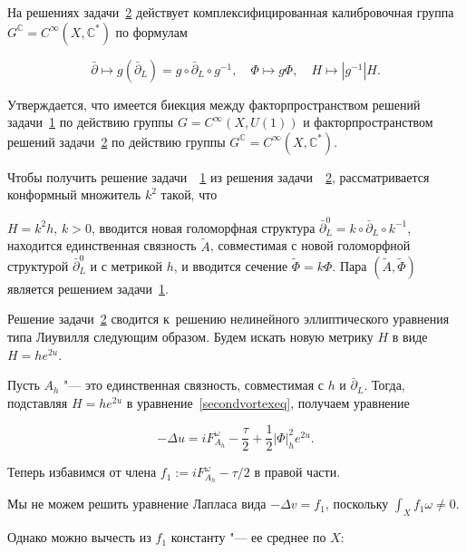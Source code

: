 \smallskip







На решениях задачи~\hyperlink{plv:2}{2} действует комплексифицированная калибровочная группа $G^{\mathbb C}=C^{\infty}(X, \mathbb C^*)$ по формулам

$$

\bar\partial\mapsto g(\bar\partial_L) =g\circ \bar\partial_L\circ g^{-1},\quad\Phi\mapsto g\Phi,\quad H\mapsto |g^{-1}|H.

$$ 

Утверждается, что имеется биекция между факторпространством решений задачи~\hyperlink{plv:1}{1} по действию группы $G=C^{\infty}(X,U(1))$ и факторпространством решений задачи~\hyperlink{plv:2}{2} по действию группы $G^{\mathbb C}=C^{\infty}(X, \mathbb C^*)$. 



Чтобы получить решение задачи~~\hyperlink{plv:1}{1}  из решения задачи~~\hyperlink{plv:2}{2}, рассматривается конформный множитель $k^2$ такой, что

$H=k^2h$, $k>0$, вводится новая голоморфная структура $\bar\partial_L^0=k\circ\bar\partial_L\circ k^{-1}$, находится единственная связность $\tilde A$, совместимая с новой голоморфной структурой  $\bar\partial_L^0$ и с метрикой $h$, и вводится сечение $\tilde\Phi=k\Phi$. Пара $(\tilde A,\tilde \Phi)$ является решением задачи~\hyperlink{plv:1}{1}.



Решение задачи~\hyperlink{plv:2}{2} сводится к~решению нелинейного эллиптического уравнения типа Лиувилля следующим образом. Будем искать новую метрику $H$ в виде $H=he^{2u}.$

Пусть $A_h$ "---  это единственная связность, совместимая с $h$ и $\bar\partial_L$. Тогда, подставляя $H=he^{2u}$ в уравнение~\eqref{secondvortexeq}, получаем уравнение

$$

-\Delta u = iF^{\omega}_{A_h}-\dfrac{\tau}2+\dfrac12|\Phi|^2_he^{2u}.

$$

Теперь избавимся от члена $f_1:=iF^{\omega}_{A_h}-{\tau}/2$ в правой части. 

Мы не можем решить уравнение Лапласа вида $-\Delta v=f_1$, поскольку $\displaystyle \int_Xf_1\omega\neq0$. 

Однако можно вычесть из $f_1$ константу "--- ее среднее по $X$:

$$

